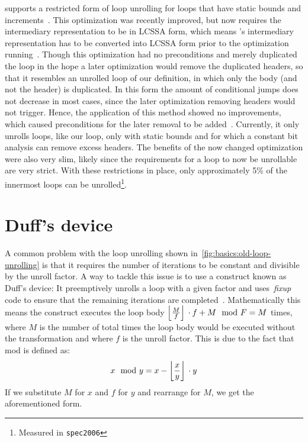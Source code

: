 \libFIRM{} supports a restricted form of loop unrolling for loops that have static bounds and increments~\cite{helmer10studienarbeit}.
This optimization was recently improved, but now requires the intermediary representation to be in LCSSA form, which means \libFIRM{}'s intermediary representation has to be converted into LCSSA form prior to the optimization running~\cite{aebi18bachelorarbeit}.
Though this optimization had no preconditions and merely duplicated the loop in the hope a later optimization would remove the duplicated headers, so that it resembles an unrolled loop of our definition, in which only the body (and not the header) is duplicated.
In this form the amount of conditional jumps does not decrease in most cases, since the later optimization removing headers would not trigger.
Hence, the application of this method showed no improvements, which caused preconditions for the later removal to be added~\cite{libfirm-unroll-static}.
Currently, it only unrolls loops, like our loop, only with static bounds and for which a constant bit analysis can remove excess headers.
The benefits of the now changed optimization were also very slim, likely since the requirements for a loop to now be unrollable are very strict.
With these restrictions in place, only approximately 5\% of the innermost loops can be unrolled\footnote{Measured in \texttt{spec2006}}.




\section{Duff's device}\label{sec:basics:duffs}

A common problem with the loop unrolling shown in~\cref{fig:basics:old-loop-unrolling} is that it requires the number of iterations to be constant and divisible by the unroll factor.
A way to tackle this issue is to use a construct known as Duff's device: It preemptively unrolls a loop with a given factor and uses~\textit{fixup} code to ensure that the remaining iterations are completed~\cite{duff_1983}.
Mathematically this means the construct executes the loop body $\left\lfloor{}\frac{M}{f}\right\rfloor{} \cdot f + M \mod F = M$ times, where $M$ is the number of total times the loop body would be executed without the transformation and where $f$ is the unroll factor.
This is due to the fact that mod is defined as:
$$x \mod{} y = x - \left\lfloor{}\frac{x}{y}\right\rfloor{} \cdot y$$
If we substitute $M$ for $x$ and $f$ for $y$ and rearrange for $M$, we get the aforementioned form.

